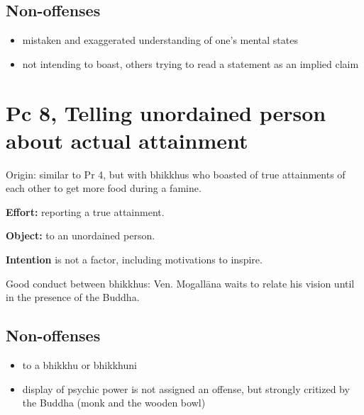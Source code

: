 \subsection{Non-offenses}

\begin{itemize}
\tightlist
\item
  mistaken and exaggerated understanding of one's mental states
\item
  not intending to boast, others trying to read a statement as an
  implied claim
\end{itemize}

\section{Pc 8, Telling unordained person about actual attainment}

Origin: similar to Pr 4, but with bhikkhus who boasted of true
attainments of each other to get more food during a famine.

\textbf{Effort:} reporting a true attainment.

\textbf{Object:} to an unordained person.

\textbf{Intention} is not a factor, including motivations to inspire.

Good conduct between bhikkhus: Ven. Mogallāna waits to relate his vision
until in the presence of the Buddha.

\subsection{Non-offenses}

\begin{itemize}
\tightlist
\item
  to a bhikkhu or bhikkhuni
\item
  display of psychic power is not assigned an offense, but strongly
  critized by the Buddha (monk and the wooden bowl)
\end{itemize}

